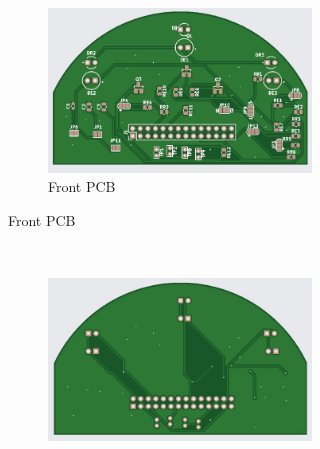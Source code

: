 \documentclass[class=report,11pt,crop=false]{standalone}
\begin{document}
\begin{figure}[h]
     \centering
    \begin{subfigure}[b]{0.3\linewidth}
        \begin{figure}
            \centering
            \includegraphics[width= 2\linewidth]{EEE3088F_final_report_latex_template-2//Figures/Front_PCB.jpg}
            \caption{Front PCB}
            \label{fig:PCB_Front}
        \end{figure}
    \end{subfigure}
    \hfill %
    \\
    \begin{subfigure}[b]{0.3\linewidth}
        \begin{figure}
            \centering
            \includegraphics[width=2\linewidth]{EEE3088F_final_report_latex_template-2//Figures/Back_PCB.jpg}

\end{figure}
\end{subfigure}
\end{figure}
\end{document}

